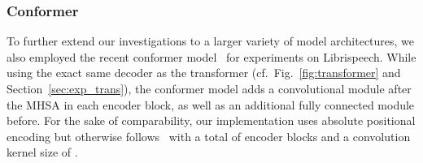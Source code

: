 \documentclass{article}
\begin{document}
\subsubsection{Conformer}\vspace{-2.5mm}
To further extend our investigations to a larger variety of model architectures, we also employed the recent conformer model~\cite{Gulati2020} for experiments on Librispeech. While using the exact same decoder as the transformer (cf.\ Fig.~\ref{fig:transformer} and Section~\ref{sec:exp_trans}), the conformer model adds a convolutional module after the MHSA in each encoder block, as well as an additional fully connected module before. For the sake of comparability, our implementation uses absolute positional encoding but otherwise follows~\cite{Guo2021} with a total of  encoder blocks and a convolution kernel size of .  
 
\end{document}
